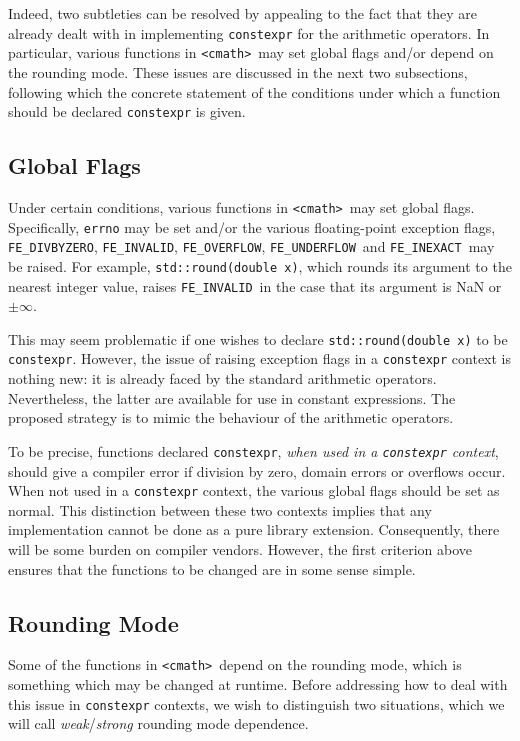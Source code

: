 \documentclass[prd,twocolumn,amsmath,amssymb,nofootinbib,eqsecnum]{revtex4-1}
\newcommand{\constexpr}{\code{constexpr}\xspace}
\newcommand{\code}[1]{{\tt #1}}
\newcommand{\header}[1]{{\tt <#1>}}
\newcommand{\cmath}{\header{cmath}}
\newcommand{\FEINVALID}{{\tt FE\_INVALID}}
\newcommand{\FEDIVBYZERO}{{\tt FE\_DIVBYZERO}}
\newcommand{\FEINEXACT}{{\tt FE\_INEXACT}}
\newcommand{\FEUNDERFLOW}{{\tt FE\_UNDERFLOW}}
\newcommand{\FEOVERFLOW}{{\tt FE\_OVERFLOW}}
\begin{document}
Indeed, two subtleties can be resolved by appealing to the fact that they are already dealt with in implementing \constexpr for the arithmetic operators. In particular, various functions in \cmath\ may set global flags and/or depend on the rounding mode. These issues are discussed in the next two subsections, following which the concrete statement of the conditions under which a function should be declared \constexpr is given.

\subsection{Global Flags}

Under certain conditions, various functions in \cmath\ may set global flags.
Specifically, \code{errno} may be set and/or the various floating-point
exception flags, \FEDIVBYZERO, \FEINVALID, \FEOVERFLOW, \FEUNDERFLOW\ and
\FEINEXACT\ may be raised. For example, \code{std::round(double x)}, which rounds its argument to the nearest integer value, raises \FEINVALID\ in the case that its argument is NaN or $\pm \infty$.

This may seem problematic if one wishes to declare \code{std::round(double x)} to be \constexpr. 
However, the issue of raising exception flags in a \constexpr context is nothing new: it is already faced by
the standard arithmetic operators. Nevertheless, the latter are available for use in constant
expressions. The proposed strategy is to mimic the behaviour of the arithmetic
operators.

To be precise, functions declared \constexpr, \emph{when used in a \constexpr
context}, should give a compiler error if division by zero, domain errors or
overflows occur. When not used in a \constexpr context, the various global
flags should be set as normal. This distinction between these two contexts
implies that any implementation cannot be done as a pure library extension.
Consequently, there will be some burden on compiler vendors. However, the first
criterion above ensures that the functions to be changed are in some sense
simple.

\subsection{Rounding Mode}

Some of the functions in \cmath\ depend on the rounding mode, which is something which may be changed at runtime. Before addressing how to deal with this issue in \constexpr contexts, we wish to distinguish two situations, which we will call \emph{weak}/\emph{strong} rounding mode dependence. 
\end{document}
